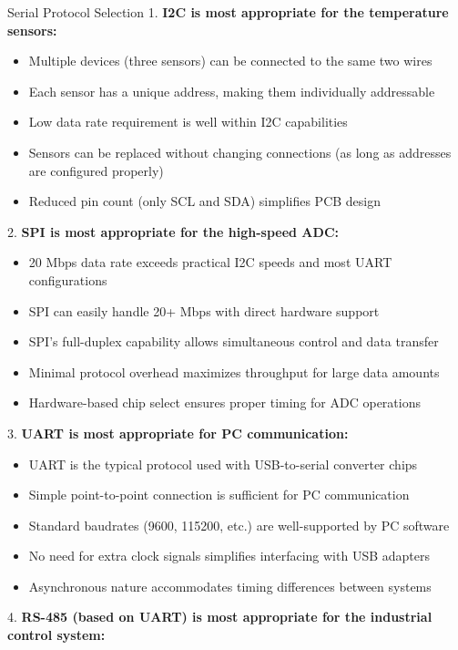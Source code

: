 \begin{example2}{Serial Protocol Selection}
1. \textbf{I2C is most appropriate for the temperature sensors:}
   \begin{itemize}
     \item Multiple devices (three sensors) can be connected to the same two wires
     \item Each sensor has a unique address, making them individually addressable
     \item Low data rate requirement is well within I2C capabilities
     \item Sensors can be replaced without changing connections (as long as addresses are configured properly)
     \item Reduced pin count (only SCL and SDA) simplifies PCB design
   \end{itemize}
   \vspace{2mm}
2. \textbf{SPI is most appropriate for the high-speed ADC:}
   \begin{itemize}
     \item 20 Mbps data rate exceeds practical I2C speeds and most UART configurations
     \item SPI can easily handle 20+ Mbps with direct hardware support
     \item SPI's full-duplex capability allows simultaneous control and data transfer
     \item Minimal protocol overhead maximizes throughput for large data amounts
     \item Hardware-based chip select ensures proper timing for ADC operations
   \end{itemize}
   \vspace{2mm}
3. \textbf{UART is most appropriate for PC communication:}
   \begin{itemize}
     \item UART is the typical protocol used with USB-to-serial converter chips
     \item Simple point-to-point connection is sufficient for PC communication
     \item Standard baudrates (9600, 115200, etc.) are well-supported by PC software
     \item No need for extra clock signals simplifies interfacing with USB adapters
     \item Asynchronous nature accommodates timing differences between systems
   \end{itemize}
   \vspace{2mm}
4. \textbf{RS-485 (based on UART) is most appropriate for the industrial control system:}

\end{example2}
